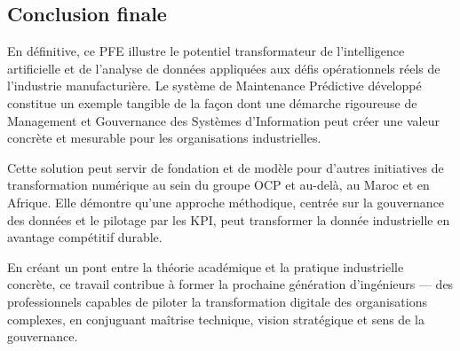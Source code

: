\documentclass[a4paper,12pt]{report}
\begin{document}
\subsection{Conclusion finale}

En définitive, ce PFE illustre le potentiel transformateur de l'intelligence artificielle et de l'analyse de données appliquées aux défis opérationnels réels de l'industrie manufacturière. Le système de Maintenance Prédictive développé constitue un exemple tangible de la façon dont une démarche rigoureuse de Management et Gouvernance des Systèmes d'Information peut créer une valeur concrète et mesurable pour les organisations industrielles.

Cette solution peut servir de fondation et de modèle pour d'autres initiatives de transformation numérique au sein du groupe OCP et au-delà, au Maroc et en Afrique. Elle démontre qu'une approche méthodique, centrée sur la gouvernance des données et le pilotage par les KPI, peut transformer la donnée industrielle en avantage compétitif durable.

En créant un pont entre la théorie académique et la pratique industrielle concrète, ce travail contribue à former la prochaine génération d'ingénieurs — des professionnels capables de piloter la transformation digitale des organisations complexes, en conjuguant maîtrise technique, vision stratégique et sens de la gouvernance.
\end{document}
